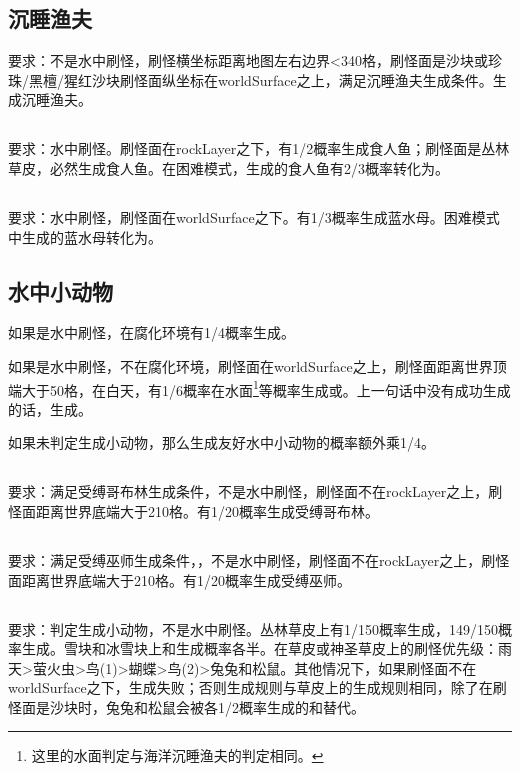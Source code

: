 \subsection{沉睡渔夫}
要求：不是水中刷怪，刷怪横坐标距离地图左右边界<340格，刷怪面是沙块或珍珠/黑檀/猩红沙块刷怪面纵坐标在worldSurface之上，满足沉睡渔夫生成条件。生成沉睡渔夫。

\subsection{}
要求：水中刷怪。刷怪面在rockLayer之下，有1/2概率生成食人鱼；刷怪面是丛林草皮，必然生成食人鱼。在困难模式，生成的食人鱼有2/3概率转化为。

\subsection{}
要求：水中刷怪，刷怪面在worldSurface之下。有1/3概率生成蓝水母。困难模式中生成的蓝水母转化为。

\subsection{水中小动物}
如果是水中刷怪，在腐化环境有1/4概率生成。

如果是水中刷怪，不在腐化环境，刷怪面在worldSurface之上，刷怪面距离世界顶端大于50格，在白天，有1/6概率在水面\footnote{这里的水面判定与海洋沉睡渔夫的判定相同。}等概率生成或。上一句话中没有成功生成的话，生成。

如果未判定生成小动物，那么生成友好水中小动物的概率额外乘1/4。

\subsection{}
要求：满足受缚哥布林生成条件，不是水中刷怪，刷怪面不在rockLayer之上，刷怪面距离世界底端大于210格。有1/20概率生成受缚哥布林。

\subsection{}
要求：满足受缚巫师生成条件，，不是水中刷怪，刷怪面不在rockLayer之上，刷怪面距离世界底端大于210格。有1/20概率生成受缚巫师。

\subsection{}
要求：判定生成小动物，不是水中刷怪。丛林草皮上有1/150概率生成，149/150概率生成。雪块和冰雪块上和生成概率各半。在草皮或神圣草皮上的刷怪优先级：雨天>萤火虫>鸟(1)>蝴蝶>鸟(2)>兔兔和松鼠。其他情况下，如果刷怪面不在worldSurface之下，生成失败；否则生成规则与草皮上的生成规则相同，除了在刷怪面是沙块时，兔兔和松鼠会被各1/2概率生成的和替代。

